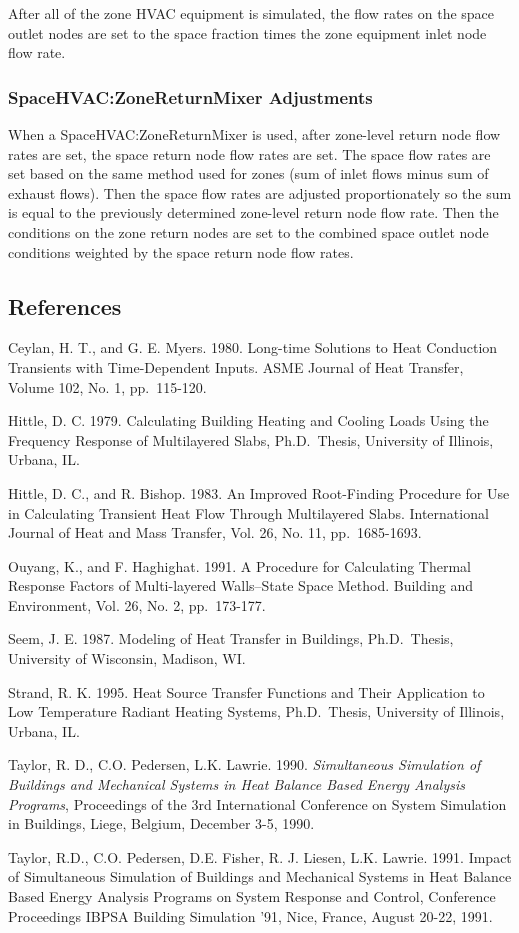 After all of the zone HVAC equipment is simulated, the flow rates on the space outlet nodes are set to the space fraction times the zone equipment inlet node flow rate.

\subsubsection{SpaceHVAC:ZoneReturnMixer Adjustments}\label{space-hvac-zoneretmixer-adjustments}
When a SpaceHVAC:ZoneReturnMixer is used, after zone-level return node flow rates are set, the space return node flow rates are set. The space flow rates are set based on the same method used for zones (sum of inlet flows minus sum of exhaust flows). Then the space flow rates are adjusted proportionately so the sum is equal to the previously determined zone-level return node flow rate. Then the conditions on the zone return nodes are set to the combined space outlet node conditions weighted by the space return node flow rates. 

\subsection{References}\label{references-043}

Ceylan, H. T., and G. E. Myers. 1980. Long-time Solutions to Heat Conduction Transients with Time-Dependent Inputs. ASME Journal of Heat Transfer, Volume 102, No. 1, pp.~115-120.

Hittle, D. C. 1979. Calculating Building Heating and Cooling Loads Using the Frequency Response of Multilayered Slabs, Ph.D.~Thesis, University of Illinois, Urbana, IL.

Hittle, D. C., and R. Bishop. 1983. An Improved Root-Finding Procedure for Use in Calculating Transient Heat Flow Through Multilayered Slabs. International Journal of Heat and Mass Transfer, Vol. 26, No. 11, pp.~1685-1693.

Ouyang, K., and F. Haghighat. 1991. A Procedure for Calculating Thermal Response Factors of Multi-layered Walls--State Space Method. Building and Environment, Vol. 26, No. 2, pp.~173-177.

Seem, J. E. 1987. Modeling of Heat Transfer in Buildings, Ph.D.~Thesis, University of Wisconsin, Madison, WI.

Strand, R. K. 1995. Heat Source Transfer Functions and Their Application to Low Temperature Radiant Heating Systems, Ph.D.~Thesis, University of Illinois, Urbana, IL.

Taylor, R. D., C.O. Pedersen, L.K. Lawrie. 1990. \emph{Simultaneous Simulation of Buildings and Mechanical Systems in Heat Balance Based Energy Analysis Programs}, Proceedings of the 3rd International Conference on System Simulation in Buildings, Liege, Belgium, December 3-5, 1990.

Taylor, R.D., C.O. Pedersen, D.E. Fisher, R. J. Liesen, L.K. Lawrie. 1991. Impact of Simultaneous Simulation of Buildings and Mechanical Systems in Heat Balance Based Energy Analysis Programs on System Response and Control, Conference Proceedings IBPSA Building Simulation '91, Nice, France, August 20-22, 1991.

